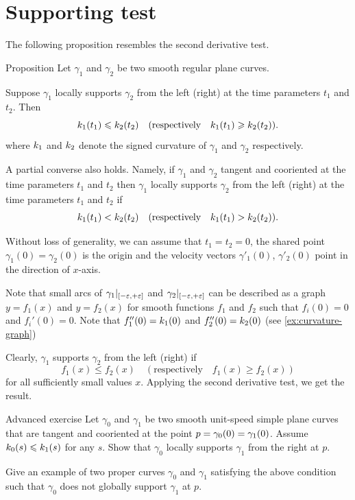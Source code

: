 \section{Supporting test}

The following proposition resembles the second derivative test. 

\begin{thm}{Proposition}\label{prop:supporting-circline}
Let $\gamma_1$ and $\gamma_2$ be two smooth regular plane curves.

Suppose $\gamma_1$ locally supports $\gamma_2$ from the left (right) at the time parameters $t_1$ and $t_2$.
Then 
\[k_1(t_1)\leqslant k_2(t_2)\quad(\text{respectively}\quad k_1(t_1)\geqslant k_2(t_2)).\]
where $k_1$ and $k_2$ denote the signed curvature of $\gamma_1$ and $\gamma_2$ respectively.

A partial converse also holds.
Namely, if $\gamma_1$ and $\gamma_2$ tangent and cooriented at the time parameters $t_1$ and $t_2$
then $\gamma_1$ locally supports $\gamma_2$ from the left (right) at the time parameters $t_1$ and $t_2$
if 
\[k_1(t_1)< k_2(t_2)\quad(\text{respectively}\quad k_1(t_1)> k_2(t_2)).\]

\end{thm}

 Without loss of generality, we can assume that $t_1=t_2=0$, the shared point $\gamma_1(0)=\gamma_2(0)$ is the origin and the velocity vectors $\gamma'_1(0)$, $\gamma'_2(0)$ point in the direction of $x$-axis.

Note that small arcs of $\gamma_1|_{[-\varepsilon,+\varepsilon]}$ and  $\gamma_2|_{[-\varepsilon,+\varepsilon]}$ can be described as a graph 
$y=f_1(x)$ and $y=f_2(x)$ for smooth functions $f_1$ and $f_2$ such that $f_i(0)=0$ and $f_i'(0)=0$.
Note that $f_1''(0)=k_1(0)$ and $f_2''(0)=k_2(0)$ (see \ref{ex:curvature-graph})

Clearly, $\gamma_1$ supports $\gamma_2$ from the left (right) if 
\[f_1(x)\le f_2(x)\quad(\text{respectively}\quad f_1(x)\ge f_2(x))\]
for all sufficiently small values $x$.
Applying the second derivative test, we get the result.
\qeds


\begin{thm}{Advanced exercise}\label{ex:support}
Let $\gamma_0$ and $\gamma_1$ be two smooth unit-speed simple plane curves that are tangent and cooriented at the point $p\z=\gamma_0(0)=\gamma_1(0)$.
Assume $k_0(s)\leqslant k_1(s)$ for any $s$.
Show that $\gamma_0$ locally supports $\gamma_1$ from the right at $p$.

Give an example of two proper curves $\gamma_0$ and $\gamma_1$ satisfying the above condition such that $\gamma_0$ does not globally support $\gamma_1$ at $p$.
\end{thm}

